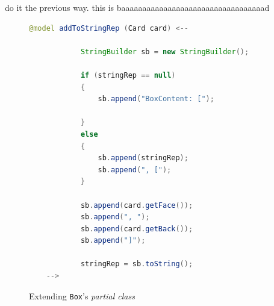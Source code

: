 \update do it the previous way. this is baaaaaaaaaaaaaaaaaaaaaaaaaaaaaaaaaad
\newpage

\vspace*{3cm}

\begin{figure}[h!]
        \centering
        \begin{lstlisting}[language=Java, keywordstyle={\bfseries\color{purple}}, backgroundcolor=\color{white}]
    @model addToStringRep (Card card) <--

            StringBuilder sb = new StringBuilder();

            if (stringRep == null)
            {
                sb.append("BoxContent: [");

            }
            else
            {
                sb.append(stringRep);
                sb.append(", [");
            }

            sb.append(card.getFace());
            sb.append(", ");
            sb.append(card.getBack());
            sb.append("]");

            stringRep = sb.toString();
    -->
        \end{lstlisting}
        \caption{Extending \texttt{Box}'s \emph{partial class}}
        \label{code:addToStringRep_inject_file}
    \end{figure}
    \FloatBarrier





